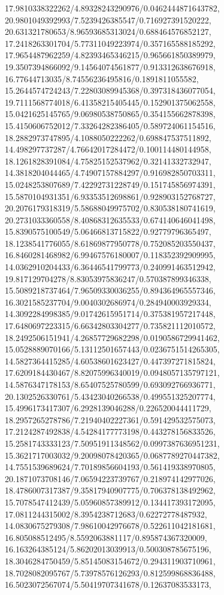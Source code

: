 {17.9810338322262/4.89328243290976/0.0462444871643782,
20.9801049392993/7.5239426385547/0.716927391520222,
20.631321780653/8.96593685313024/0.688464576852127,
17.2418263301704/5.77311049223974/0.357165588185292,
17.9654487962259/4.82393465346215/0.965661850389979,
19.3507394866092/9.14564074561877/0.913312638676918,
16.77644713035/8.74556236495816/0.1891811055582,
15.2644574724243/7.22803089945368/0.397318436077054,
19.7111568774018/6.41358215405445/0.152901375062558,
15.0421625145765/9.06980538750865/0.354155662878398,
15.4150606752012/7.33264282386405/0.589724061154516,
18.2882973747895/4.1088050222262/0.698847537511892,
14.498297737287/4.76642017284472/0.100114480144958,
18.1261828391084/4.75825152537962/0.32141332732947,
14.3818204044465/4.74907157884297/0.916982850703311,
15.0248253807689/7.42292731228749/0.151745856974391,
15.5870104931351/6.93353512698861/0.928903152768727,
20.2076179318319/5.58688049975702/0.830538180741619,
20.2731033360558/8.40868312635533/0.674140646041498,
15.8390575100549/5.06466813715822/0.92779796365497,
18.1238541776055/8.61869877950778/0.752085203550437,
16.8460281468982/6.99467576180007/0.118352392909995,
14.0362910204433/6.36446541799773/0.240991463512942,
19.817129704278/8.83053975836247/0.570387899346338,
15.5089218737464/7.96509330036255/0.894364965557346,
16.3021585237704/9.0040302686974/0.284940003929334,
14.3092284998385/9.01742615951714/0.375381957217448,
17.6480697223315/6.66342803304277/0.735821112010572,
18.2492506151941/4.26857729682298/0.0190586729941462,
15.0528889070166/5.13112501657443/0.0236751514265305,
14.5827364415285/4.60538601623427/0.447397271815824,
17.6209184430467/8.82075996340019/0.0948057135797121,
14.5876347178153/8.65407525780599/0.693092766936771,
20.1302526330761/5.43423040266538/0.499551325207774,
15.4996173417307/6.2928139046288/0.226520044411729,
18.2957265278786/7.21940402227361/0.591429532575073,
17.2124287492838/4.54284177773198/0.443278156833526,
15.2581743333123/7.50951911348562/0.0997387636951231,
15.3621717003032/9.20098078420365/0.0687789270447382,
14.7551539689624/7.70189856604193/0.561419338970805,
20.1871073708146/7.06594223739767/0.218974142977026,
18.4786007317387/9.35817940907775/0.706378138492962,
15.7078547412439/5.05960857389912/0.134417393172095,
17.0811244315002/8.3954238712683/0.62272778487932,
14.0830675279308/7.98610042976678/0.522611042181681,
16.805088512495/8.5592063881117/0.895874367320009,
16.163264385124/5.86202013039913/0.500308785675196,
18.3046284750459/5.85145083154672/0.294311903710961,
18.7028082095767/5.73978576126293/0.812599868836488,
16.5023072567074/5.50419707341678/0.12637083533173,
}
